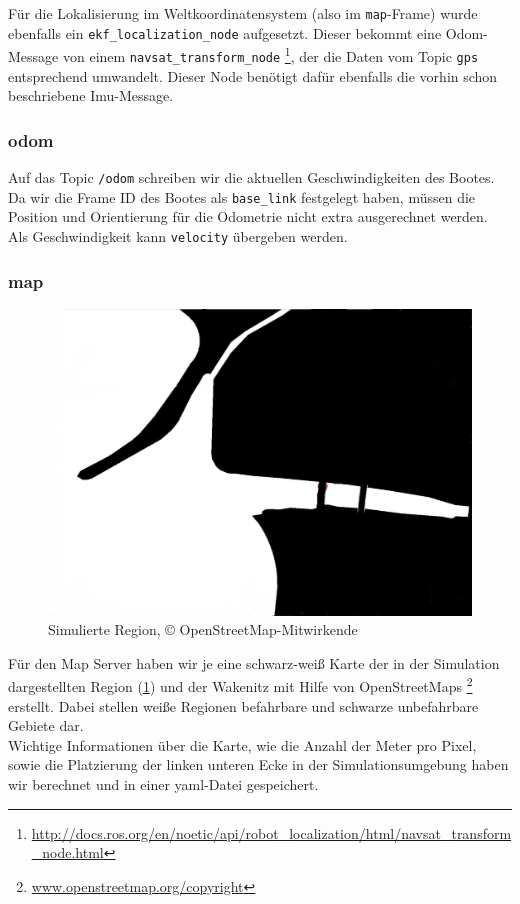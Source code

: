 \documentclass[11pt]{article}
\begin{document}
Für die Lokalisierung im Weltkoordinatensystem (also im \texttt{map}-Frame) wurde ebenfalls ein \texttt{ekf\_localization\_node} aufgesetzt. Dieser bekommt eine Odom-Message von einem \texttt{navsat\_transform\_node} \footnote{\url{http://docs.ros.org/en/noetic/api/robot_localization/html/navsat_transform_node.html}}, der die Daten vom Topic \texttt{gps} entsprechend umwandelt. Dieser Node benötigt dafür ebenfalls die vorhin schon beschriebene Imu-Message.

\subsubsection{odom}
Auf das Topic \texttt{/odom} schreiben wir die aktuellen Geschwindigkeiten des Bootes. Da wir die Frame ID des Bootes als \texttt{base\_link} festgelegt haben, müssen die Position und Orientierung für die Odometrie nicht extra ausgerechnet werden. Als Geschwindigkeit kann \texttt{velocity} übergeben werden.

\subsubsection{map}

\begin{figure}
	\includegraphics[width=\linewidth]{diluvio.jpg}
	\caption{Simulierte Region, © OpenStreetMap-Mitwirkende}
	\label{diluvio}
\end{figure}

Für den Map Server haben wir je eine schwarz-weiß Karte der in der Simulation dargestellten Region (\ref{diluvio}) und der Wakenitz mit Hilfe von OpenStreetMaps \footnote{\url{www.openstreetmap.org/copyright}} erstellt. Dabei stellen weiße Regionen befahrbare und schwarze unbefahrbare Gebiete dar.\\
Wichtige Informationen über die Karte, wie die Anzahl der Meter pro Pixel, sowie die Platzierung der linken unteren Ecke in der Simulationsumgebung haben wir berechnet und in einer yaml-Datei gespeichert.
\end{document}
